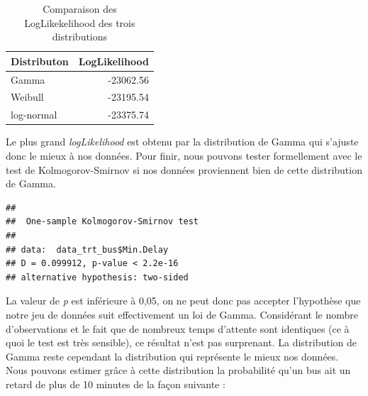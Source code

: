\documentclass[
  11pt,
  french,
]{book}
\makeatletter
\newenvironment{Shaded}{\begin{snugshade}}{\end{snugshade}}
\newcommand{\DataTypeTok}[1]{\textcolor[rgb]{0.13,0.29,0.53}{#1}}
\newcommand{\DecValTok}[1]{\textcolor[rgb]{0.00,0.00,0.81}{#1}}
\newcommand{\KeywordTok}[1]{\textcolor[rgb]{0.13,0.29,0.53}{\textbf{#1}}}
\newcommand{\NormalTok}[1]{#1}
\newcommand{\OperatorTok}[1]{\textcolor[rgb]{0.81,0.36,0.00}{\textbf{#1}}}
\newcommand{\StringTok}[1]{\textcolor[rgb]{0.31,0.60,0.02}{#1}}
\newenvironment{kframe}{%
\medskip{}
\setlength{\fboxsep}{.8em}
 \def\at@end@of@kframe{}%
 \ifinner\ifhmode%
  \def\at@end@of@kframe{\end{minipage}}%
  \begin{minipage}{\columnwidth}%
 \fi\fi%
 \def\FrameCommand##1{\hskip\@totalleftmargin \hskip-\fboxsep
 \colorbox{shadecolor}{##1}\hskip-\fboxsep
     \hskip-\linewidth \hskip-\@totalleftmargin \hskip\columnwidth}%
 \MakeFramed {\advance\hsize-\width
   \@totalleftmargin\z@ \linewidth\hsize
   \@setminipage}}%
 {\par\unskip\endMakeFramed%
 \at@end@of@kframe}
\renewenvironment{Shaded}{\begin{kframe}}{\end{kframe}}
\makeatother
\begin{document}
\begin{table}

\caption{\label{tab:tabledistribs}Comparaison des LogLikekelihood des trois distributions}
\centering
\fontsize{8}{10}\selectfont
\begin{tabular}[t]{lr}
\toprule
Distributon & LogLikelihood\\
\midrule
Gamma & -23062.56\\
Weibull & -23195.54\\
log-normal & -23375.74\\
\bottomrule
\end{tabular}
\end{table}

Le plus grand \emph{logLikelihood} est obtenu par la distribution de Gamma qui s'ajuste donc le mieux à nos données. Pour finir, nous pouvons tester formellement avec le test de Kolmogorov-Smirnov si nos données proviennent bien de cette distribution de Gamma.

\begin{Shaded}
\end{Shaded}

\begin{verbatim}
## 
## 	One-sample Kolmogorov-Smirnov test
## 
## data:  data_trt_bus$Min.Delay
## D = 0.099912, p-value < 2.2e-16
## alternative hypothesis: two-sided
\end{verbatim}

La valeur de \emph{p} est inférieure à 0,05, on ne peut donc pas accepter l'hypothèse que notre jeu de données suit effectivement un loi de Gamma. Considérant le nombre d'observations et le fait que de nombreux temps d'attente sont identiques (ce à quoi le test est très sensible), ce résultat n'est pas surprenant. La distribution de Gamma reste cependant la distribution qui représente le mieux nos données. Nous pouvons estimer grâce à cette distribution la probabilité qu'un bus ait un retard de plus de 10 minutes de la façon suivante :

\begin{Shaded}
\end{Shaded}
\end{document}
